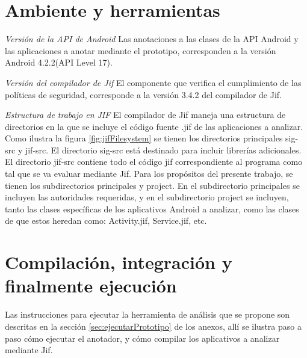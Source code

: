 \section{Ambiente y herramientas}
\label{sec:ambiente}
\textit{Versión de la API de Android}\newline
Las anotaciones a las clases de la API Android y las aplicaciones a anotar
mediante el prototipo, corresponden a la versión Android 4.2.2(API Level 17).

\textit{Versión del compilador de Jif}\newline
El componente que verifica el cumplimiento de las políticas de seguridad,
corresponde a la versión 3.4.2 del compilador de Jif.

\textit{Estructura de trabajo en JIF}\newline
El compilador de Jif maneja una estructura de directorios en la que se incluye
el código fuente .jif de las aplicaciones a analizar. Como ilustra la figura
\ref{fig:jifFilesystem} se tienen los directorios principales sig-src y jif-src.
El directorio sig-src está destinado para incluir librerías adicionales.\newline 
El directorio jif-src contiene todo el código jif correspondiente al programa
como tal que se va evaluar mediante Jif. Para los propósitos del presente
trabajo, se tienen los subdirectorios principales y project. En el subdirectorio
principales se incluyen las autoridades requeridas, y en el subdirectorio
project se incluyen, tanto las clases específicas de los aplicativos Android a
analizar, como las clases de que estos heredan como: Activity.jif, Service.jif,
etc.

\section{Compilación, integración y finalmente ejecución }
\label{sec:compilacion}
Las instrucciones para ejecutar la herramienta de análisis que se propone son
descritas en la sección \ref{sec:ejecutarPrototipo} de los anexos, allí se
ilustra paso a paso cómo ejecutar el anotador, y cómo compilar los aplicativos
a analizar mediante Jif.
